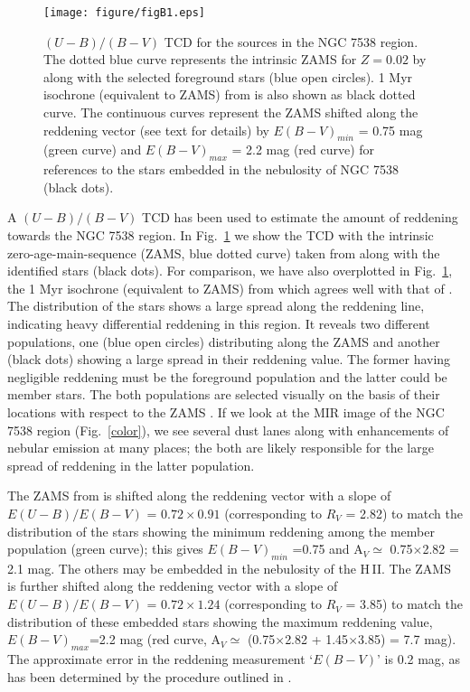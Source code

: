\documentclass[a4paper,fleqn,usenatbib,useAMS]{mnras}
\begin{document}
\begin{figure}
\centering
\texttt{[image: figure/figB1.eps]}
\caption{\label{ccd} $(U-B)/(B-V)$ TCD for the sources in the NGC 7538 region. The dotted blue curve represents the intrinsic
ZAMS for $Z=0.02$ by \citet{Schmidt-Kaler1982} along with the selected foreground stars (blue open circles). 
1 Myr isochrone (equivalent to ZAMS) from \citet{2008AA...482..883M} is also shown as black dotted curve.
The continuous curves represent the \citet{Schmidt-Kaler1982} ZAMS shifted along 
the reddening vector (see text for details) by $E(B-V)_{min}$ = 0.75 mag  (green curve) and  
$E(B-V)_{max}$ = 2.2 mag (red curve) for references to the stars embedded in the nebulosity of NGC 7538 (black dots). 
}
\end{figure}

A $(U - B)/(B - V)$ TCD has been used to estimate the amount of reddening
towards the NGC 7538 region. In Fig.~\ref{ccd} we show the TCD with the intrinsic zero-age-main-sequence
(ZAMS, blue dotted curve) taken from \citet{Schmidt-Kaler1982} along with the identified stars (black dots).
For comparison, we have also overplotted in Fig.~\ref{ccd}, the 1 Myr isochrone (equivalent to ZAMS) from \citet{2008AA...482..883M}
which agrees well with that of \citet{Schmidt-Kaler1982}.
The distribution of the stars shows a large spread along the reddening line, indicating 
heavy differential reddening in this region.
It reveals two different populations, one (blue open circles) distributing along the ZAMS and another (black dots) 
showing a large spread in their reddening value.       
The former having negligible reddening must be the foreground population and the latter could be member stars.
The both populations are selected visually on the basis of their locations with respect to the ZAMS 
\citep[for detail cf.,][]{1974ASSL...41.....G,1994ApJS...90...31P}. 
If we look at the MIR image of the NGC 7538 region (Fig.~\ref{color}), 
we see  several dust lanes along with enhancements
of nebular emission at many places; the both are likely responsible for the large spread of reddening in the latter population.

The ZAMS from \citet{Schmidt-Kaler1982} is  shifted along the reddening vector with a slope of
$E(U - B)/E(B - V)$ = $0.72\times0.91$ (corresponding to $R_V$ = 2.82) to match the distribution of the stars showing the minimum 
reddening among the member population (green curve); this gives $E(B-V)_{min}$ =0.75 and  A$_V\simeq$ 0.75$\times$2.82 = 2.1 mag. 
The others may be embedded in the nebulosity of the H\,{\sevensize II}.
The ZAMS is further shifted along the reddening vector with a slope of
$E(U - B)/E(B - V)$ = $0.72\times1.24$ (corresponding to $R_V$ = 3.85) to match the distribution of these embedded stars showing the maximum 
reddening value, $E(B-V)_{max}$=2.2 mag (red curve,  A$_V\simeq$ (0.75$\times$2.82 + 1.45$\times$3.85) = 7.7 mag). 
The approximate error in the reddening measurement `$E(B-V)$' is 0.2 mag, as has been determined by the procedure
 outlined in \citet{1994ApJS...90...31P}.
\end{document}

